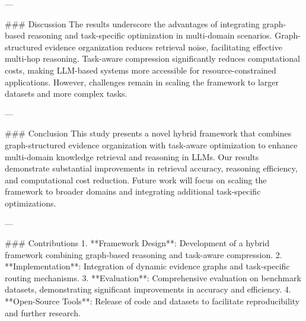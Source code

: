 ---

### Discussion
The results underscore the advantages of integrating graph-based reasoning and task-specific optimization in multi-domain scenarios. Graph-structured evidence organization reduces retrieval noise, facilitating effective multi-hop reasoning. Task-aware compression significantly reduces computational costs, making LLM-based systems more accessible for resource-constrained applications. However, challenges remain in scaling the framework to larger datasets and more complex tasks.

---

### Conclusion
This study presents a novel hybrid framework that combines graph-structured evidence organization with task-aware optimization to enhance multi-domain knowledge retrieval and reasoning in LLMs. Our results demonstrate substantial improvements in retrieval accuracy, reasoning efficiency, and computational cost reduction. Future work will focus on scaling the framework to broader domains and integrating additional task-specific optimizations.

---

### Contributions
1. **Framework Design**: Development of a hybrid framework combining graph-based reasoning and task-aware compression.
2. **Implementation**: Integration of dynamic evidence graphs and task-specific routing mechanisms.
3. **Evaluation**: Comprehensive evaluation on benchmark datasets, demonstrating significant improvements in accuracy and efficiency.
4. **Open-Source Tools**: Release of code and datasets to facilitate reproducibility and further research.

